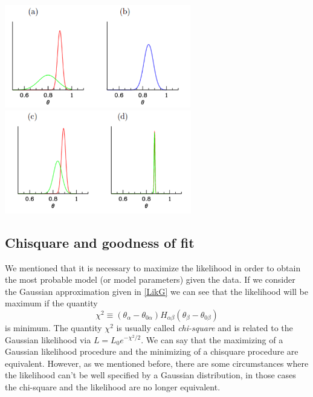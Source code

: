 \documentclass[onecolumn,           %
               showpacs,            %
               preprintnumbers,     %
               aps,                 %
               prl,          	    %
               letterpaper,             %
               superscriptaddress,      %
               nofootinbib,         %
               tightenlines,        %
               floats,floatfix      %
               ,usenatbib,
               ]{revtex4-1}
\begin{document}
\begin{minipage}{\textwidth}
\centering
\includegraphics[height=4.5cm]{Figures/g1.png}
\includegraphics[height=4.5cm]{Figures/g2.png}
\label{gausian1}
\end{minipage}
\subsection{Chisquare and goodness of fit}

We mentioned that it is necessary to maximize the likelihood in order to obtain the most probable model (or model parameters) given the data. If we consider the Gaussian approximation given in \eqref{LikG} we can see that the likelihood will be maximum if the quantity
\begin{equation}\label{chi2}
\chi^2\equiv(\theta_\alpha-\theta_{0\alpha})H_{\alpha\beta}(\theta_\beta-\theta_{0\beta})
\end{equation}
is minimum. The quantity $\chi^2$ is usually called \textit{chi-square} and is related to the Gaussian likelihood via $L=L_0e^{-\chi^2/2}$. We can say that the maximizing of a Gaussian likelihood procedure and the minimizing of a chisquare procedure are equivalent. However, as we mentioned before, there are some circumstances where the likelihood can't be well specified by a Gaussian distribution, in those cases the chi-square and the likelihood are no longer equivalent. 
\end{document}

